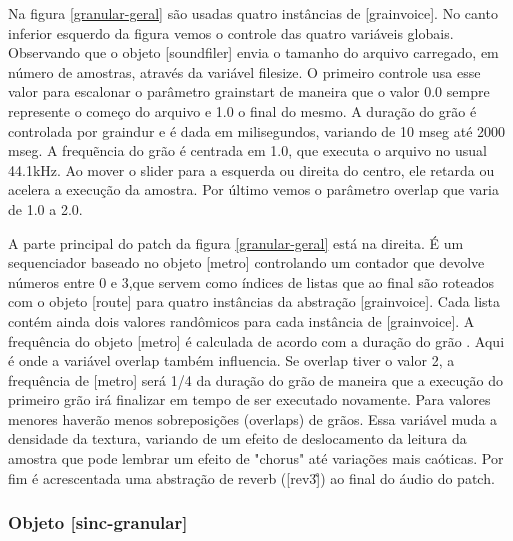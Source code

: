 \documentclass{ppgmus}
\begin{document}
Na figura \ref{granular-geral} são usadas quatro instâncias de [grainvoice]. No canto inferior esquerdo da figura
vemos o controle das quatro variáveis globais. Observando que o objeto [soundfiler] envia o tamanho do arquivo
carregado, em número de amostras, através da variável filesize. O primeiro controle usa esse valor para escalonar
o parâmetro grainstart de maneira que o valor 0.0 sempre represente o começo do arquivo e 1.0 o final do mesmo.
A duração do grão é controlada por graindur e é dada em milisegundos, variando de 10 mseg até 2000 mseg.
A frequẽncia do grão é centrada em 1.0, que executa o arquivo no usual 44.1kHz. Ao mover o slider para a esquerda
ou direita do centro, ele retarda ou acelera a execução da amostra. Por último vemos o parâmetro overlap que varia de
1.0 a 2.0.

A parte principal do patch da figura \ref{granular-geral} está na direita. É um sequenciador baseado no objeto
[metro] controlando um contador que devolve números entre 0 e 3,que servem como índices de listas que ao final
são roteados com o objeto [route] para quatro instâncias da abstração [grainvoice]. Cada lista contém ainda dois
valores randômicos para cada instância de [grainvoice]. A frequência do objeto [metro] é calculada de acordo com a duração
do grão . Aqui é onde a variável
overlap também influencia. Se overlap tiver o valor 2, a frequência de [metro] será 1/4 da duração
do grão de maneira que a execução do primeiro grão irá finalizar em tempo de ser executado novamente.
Para valores menores haverão menos sobreposições (overlaps) de grãos. Essa variável muda a densidade da
textura, variando de um efeito de deslocamento da leitura da amostra que pode lembrar um efeito de 
"chorus" até variações mais caóticas. Por fim é acrescentada uma abstração de reverb ([rev3\~]) ao final
do áudio do patch.



\subsubsection{Objeto [sinc-granular]}



\end{document}
